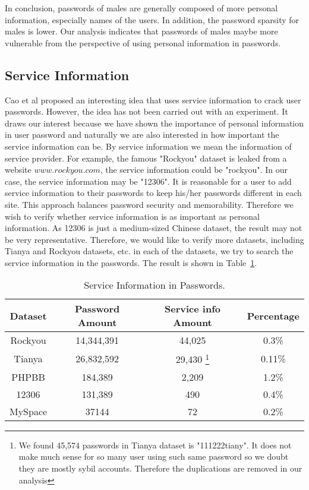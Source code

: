 In conclusion, passwords of males are generally composed of more personal information, especially names of the users. In addition, the password sparsity for males is lower. Our analysis indicates that passwords of males maybe more vulnerable from the perspective of using personal information in passwords. 


\subsection{Service Information} 
Cao et al \cite{cao2014personalized} proposed an interesting idea that uses service information to crack user passwords. However, the idea has not been carried out with an experiment. It draws our interest because we have shown the importance of personal information in user password and naturally we are also interested in how important the service information can be. By service information we mean the information of service provider. For example, the famous "Rockyou" dataset is leaked from a website $www.rockyou.com$, the service information could be "rockyou". In our case, the service information may be "12306". It is reasonable for a user to add service information to their passwords to keep his/her passwords different in each site. This approach balances password security and memorability. Therefore we wish to verify whether service information is as important as personal information. As 12306 is just a medium-sized Chinese dataset, the result may not be very representative. Therefore, we would like to verify more datasets, including Tianya and Rockyou datasets, etc. in each of the datasets, we try to search the service information in the passwords. The result is shown in Table~\ref{t7}.

\begin{table}[!]
\centering
\caption{Service Information in Passwords.}
\begin{adjustbox}{max width=0.48\textwidth}
\begin{tabular}{|c|c|c|c|} \hline
Dataset & Password Amount & Service info Amount & Percentage\\ \hline
Rockyou & 14,344,391 & 44,025 & 0.3\%\\ 
Tianya & 26,832,592 & 29,430{ \footnote{We found 45,574 passwords in Tianya dataset is "111222tiany". It does not make much sense for so many user using such same password so we doubt they are mostly sybil accounts. Therefore the duplications are removed in our analysis} } &0.11\%\\ 
PHPBB & 184,389 & 2,209 & 1.2\%\\ 
12306 & 131,389 & 490 & 0.4\%\\ 
MySpace & 37144 & 72 & 0.2\%\\ 
\hline\end{tabular}
\end{adjustbox}
\label{t7}
\end{table}

